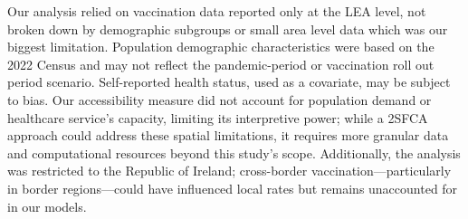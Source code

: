 \documentclass{article}
\begin{document}
Our analysis relied on vaccination data reported only at the LEA level,
not broken down by demographic subgroups or small area level data which
was our biggest limitation. Population demographic characteristics were
based on the 2022 Census and may not reflect the pandemic-period or
vaccination roll out period scenario. Self-reported health status, used
as a covariate, may be subject to bias. Our accessibility measure did
not account for population demand or healthcare service's capacity,
limiting its interpretive power; while a 2SFCA approach could address
these spatial limitations, it requires more granular data and
computational resources beyond this study's scope. Additionally, the
analysis was restricted to the Republic of Ireland; cross-border
vaccination---particularly in border regions---could have influenced
local rates but remains unaccounted for in our models.
\end{document}
